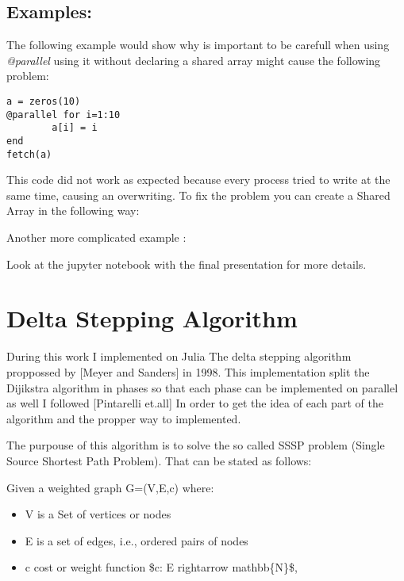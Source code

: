\documentclass[letterpaper,10pt,english]{sphinxmanual}
\begin{document}
\section{Examples:}
\label{JuliaPar:id1}
The following example would show why is important to be carefull when using \emph{@parallel} using it without declaring a shared array might cause the following problem:

\begin{Verbatim}[commandchars=\\\{\}]
a = zeros(10)
@parallel for i=1:10
        a[i] = i
end
fetch(a)
\end{Verbatim}



This code did not work as expected because every process tried to write at the same time, causing an overwriting. To fix the problem you can create a Shared Array in the following way:



Another more complicated example :

Look at the jupyter notebook with the final presentation for more details.


\chapter{Delta Stepping Algorithm}
\label{Algorithm:delta-stepping-algorithm}\label{Algorithm::doc}\label{Algorithm:algorithm}
During this work I implemented on Julia  The delta stepping algorithm proppossed by {[}Meyer and Sanders{]} in 1998. This implementation split the Dijikstra algorithm  in phases so that each phase can be implemented on parallel as well I followed {[}Pintarelli et.all{]} In order to get the idea of each part of the algorithm and the propper way to implemented.

The purpouse of this algorithm is to solve the so called SSSP problem (Single Source Shortest Path Problem). That can be stated as follows:

Given a weighted graph G=(V,E,c) where:
\begin{itemize}
\item {} 
V is a Set of vertices or nodes

\item {} 
E is a set of edges, i.e., ordered pairs of nodes

\item {} 
c cost or weight function \$c: E rightarrow mathbb\{N\}\$,

\end{itemize}
\end{document}
